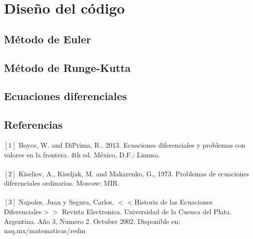 \documentclass[10pt]{article}
\begin{document}
	\section{Diseño del código}
		\subsection{Método de Euler}
			
		\subsection{Método de Runge-Kutta}
			
		\subsection{Ecuaciones diferenciales}
			
	\begin{multicols}{2} 
		\section{Referencias} 
		$[1]$ Boyce, W. and DiPrima, R., 2013. Ecuaciones diferenciales y problemas con valores en la frontera. 4th ed. México, D.F.: Limusa.\\\\
		$[2]$ Kiseliov, A., Kiseljak, M. and Makarenko, G., 1973. Problemas de ecuaciones diferenciales ordinarias. Moscow: MIR.\\\\
		$[3]$ Napoles, Juan y Segura, Carlos. $<<$Historia de las Ecuaciones Diferenciales$>>$ Revista Electronica. Universidad de la Cuenca del Plata. Argentina. Año 3, Numero 2. Octubre 2002. Disponible en: uaq.mx/matematicas/redm
		
	\end{multicols} 
\end{document}
